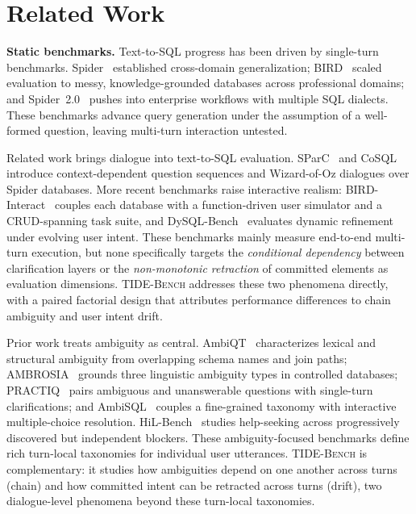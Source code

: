 \section{Related Work}
\label{sec:related}

\noindent\textbf{Static benchmarks.}
Text-to-SQL progress has been driven by single-turn benchmarks. Spider~\citep{yu2018spider} established cross-domain generalization; BIRD~\citep{li2023bird} scaled evaluation to messy, knowledge-grounded databases across professional domains; and Spider~2.0~\citep{lei2025spider2} pushes into enterprise workflows with multiple SQL dialects. These benchmarks advance query generation under the assumption of a well-formed question, leaving multi-turn interaction untested.

Related work brings dialogue into text-to-SQL evaluation. SParC~\citep{yu2019sparc} and CoSQL~\citep{yu2019cosql} introduce context-dependent question sequences and Wizard-of-Oz dialogues over Spider databases. More recent benchmarks raise interactive realism: BIRD-Interact~\citep{huo2026interact} couples each database with a function-driven user simulator and a CRUD-spanning task suite, and DySQL-Bench~\citep{sun2025dysql} evaluates dynamic refinement under evolving user intent. These benchmarks mainly measure end-to-end multi-turn execution, but none specifically targets the \emph{conditional dependency} between clarification layers or the \emph{non-monotonic retraction} of committed elements as evaluation dimensions. \textsc{TIDE-Bench} addresses these two phenomena directly, with a paired factorial design that attributes performance differences to chain ambiguity and user intent drift.

Prior work treats ambiguity as central. AmbiQT~\citep{bhaskar2023ambiqt} characterizes lexical and structural ambiguity from overlapping schema names and join paths; AMBROSIA~\citep{saparina2024ambrosia} grounds three linguistic ambiguity types in controlled databases; PRACTIQ~\citep{dong2025practiq} pairs ambiguous and unanswerable questions with single-turn clarifications; and AmbiSQL~\citep{ding2026ambisql} couples a fine-grained taxonomy with interactive multiple-choice resolution. HiL-Bench~\citep{trinh2026hilbench} studies help-seeking across progressively discovered but independent blockers. These ambiguity-focused benchmarks define rich turn-local taxonomies for individual user utterances. \textsc{TIDE-Bench} is complementary: it studies how ambiguities depend on one another across turns (chain) and how committed intent can be retracted across turns (drift), two dialogue-level phenomena beyond these turn-local taxonomies.
